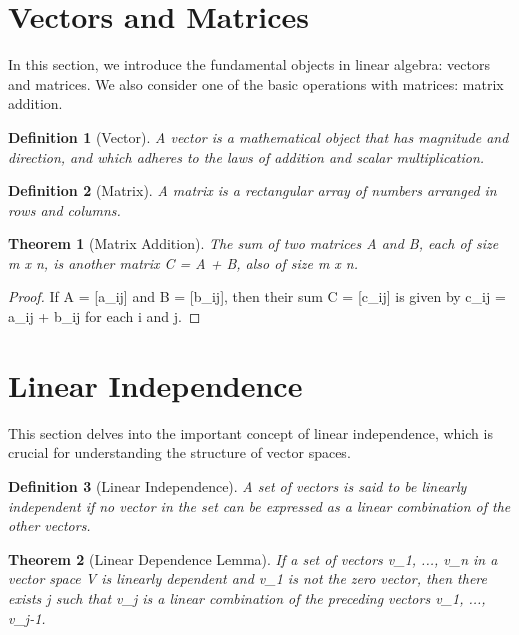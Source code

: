 \documentclass{article}
\newtheorem{definition}{Definition}[section]
\newtheorem{theorem}{Theorem}[section]
\begin{document}
\section{Vectors and Matrices}
In this section, we introduce the fundamental objects in linear algebra: vectors and matrices.
We also consider one of the basic operations with matrices: matrix addition.

\begin{definition}[Vector]
A vector is a mathematical object that has magnitude and direction, and which adheres to the laws of addition and scalar multiplication.
\end{definition}

\begin{definition}[Matrix]
A matrix is a rectangular array of numbers arranged in rows and columns.
\end{definition}

\begin{theorem}[Matrix Addition]
The sum of two matrices A and B, each of size m x n, is another matrix C = A + B, also of size m x n.
\end{theorem}

\begin{proof}
If A = [a_{ij}] and B = [b_{ij}], then their sum C = [c_{ij}] is given by c_{ij} = a_{ij} + b_{ij} for each i and j.
\end{proof}

\section{Linear Independence}
This section delves into the important concept of linear independence, which is crucial for understanding the structure of vector spaces.

\begin{definition}[Linear Independence]
A set of vectors is said to be linearly independent if no vector in the set can be expressed as a linear combination of the other vectors.
\end{definition}

\begin{theorem}[Linear Dependence Lemma]
If a set of vectors {v_1, ..., v_n} in a vector space V is linearly dependent and v_1 is not the zero vector, then there exists j such that v_j is a linear combination of the preceding vectors v_1, ..., v_{j-1}.
\end{theorem}
\end{document}
